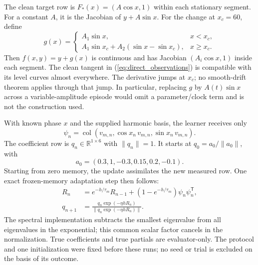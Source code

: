 \documentclass[journal]{IEEEtran}
\newcommand{\col}{\operatorname{col}}
\begin{document}
The clean target row is $F_*(x)=(A\cos x,1)$ within each stationary
segment. For a constant $A$, it is the Jacobian of $y+A\sin x$. For the
change at $x_c=60$, define
\begin{equation}
 g(x)=\begin{cases}
 A_1\sin x,&x<x_c,\\
 A_1\sin x_c+A_2(\sin x-\sin x_c),&x\ge x_c.
 \end{cases}
 \label{eq:direct_piecewise_level}
\end{equation}
Then $f(x,y)=y+g(x)$ is continuous and has Jacobian $(A_i\cos x,1)$
inside each segment. The clean tangent in (\ref{eq:direct_observations})
is compatible with its level curves almost everywhere. The derivative
jumps at $x_c$; no smooth-drift theorem applies through that jump.
In particular, replacing $g$ by $A(t)\sin x$ across a variable-amplitude
episode would omit a parameter/clock term and is not the construction used.

With known phase $x$ and the supplied harmonic basis, the learner receives
only
\begin{equation}
 \psi_n=\col(v_{m,n},\cos x_n\,v_{m,n},\sin x_n\,v_{m,n}).
 \label{eq:direct_lift}
\end{equation}
The coefficient row is $q_n\in\mathbb R^{1\times6}$ with $\|q_n\|=1$.
It starts at $q_0=a_0/\|a_0\|$, with
\begin{equation*}
 a_0=(0.3,1,-0.3,0.15,0.2,-0.1).
\end{equation*}
Starting from zero memory, the update assimilates the new measured row.
One exact frozen-memory adaptation
step then follows:
\begin{align}
 R_n&=e^{-h/\tau_m}R_{n-1}+(1-e^{-h/\tau_m})\psi_n\psi_n^{\mathsf T},\\
 q_{n+1}&=\frac{q_n\exp(-\eta hR_n)}{\|q_n\exp(-\eta hR_n)\|}.
 \label{eq:direct_step}
\end{align}
The spectral implementation subtracts the smallest eigenvalue from all
eigenvalues in the exponential; this common scalar factor cancels in the
normalization. True coefficients and true partials are evaluator-only.
The protocol and one initialization were fixed before these runs; no
seed or trial is excluded on the basis of its outcome.
\end{document}
